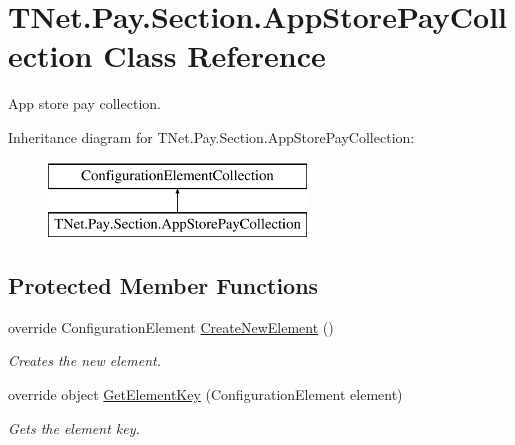\hypertarget{class_t_net_1_1_pay_1_1_section_1_1_app_store_pay_collection}{}\section{T\+Net.\+Pay.\+Section.\+App\+Store\+Pay\+Collection Class Reference}
\label{class_t_net_1_1_pay_1_1_section_1_1_app_store_pay_collection}


App store pay collection.  


Inheritance diagram for T\+Net.\+Pay.\+Section.\+App\+Store\+Pay\+Collection\+:\begin{figure}[H]
\begin{center}
\leavevmode
\includegraphics[height=2.000000cm]{class_t_net_1_1_pay_1_1_section_1_1_app_store_pay_collection}
\end{center}
\end{figure}
\subsection*{Protected Member Functions}
\begin{DoxyCompactItemize}
\item 
override Configuration\+Element \mbox{\hyperlink{class_t_net_1_1_pay_1_1_section_1_1_app_store_pay_collection_ab44cc87b1036bbbd680a9440eed0664a}{Create\+New\+Element}} ()
\begin{DoxyCompactList}\small\item\em Creates the new element. \end{DoxyCompactList}\item 
override object \mbox{\hyperlink{class_t_net_1_1_pay_1_1_section_1_1_app_store_pay_collection_a2009b8860cf11f12d439bd89bd09663a}{Get\+Element\+Key}} (Configuration\+Element element)
\begin{DoxyCompactList}\small\item\em Gets the element key. \end{DoxyCompactList}\end{DoxyCompactItemize}
